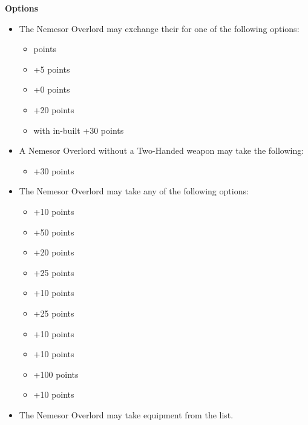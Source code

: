 \begin{minipage}[t]{0.72\textwidth}
	\vspace*{2em}
	\textbf{Options}
	\begin{itemize}
		\item The Nemesor Overlord may exchange their  for one of the following options:
		\begin{itemize}			
			\item {}  points
			\item {} \dotfill +5 points
			\item {} \dotfill +0 points
			\item {} \dotfill +20 points
			\item {} with in-built  \dotfill +30 points
		\end{itemize}
		\item A Nemesor Overlord without a Two-Handed weapon may take the following:
		\begin{itemize}
			\item {} \dotfill +30 points
		\end{itemize}
		\item The Nemesor Overlord may take any of the following options:
		\begin{itemize}
			\item {} \dotfill +10 points
			\item {} \dotfill +50 points
			\item {} \dotfill +20 points
			\item {} \dotfill +25 points
			\item {} \dotfill +10 points
			\item {} \dotfill +25 points
			\item {} \dotfill +10 points
			\item {} \dotfill +10 points
			\item {} \dotfill +100 points
			\item {} \dotfill +10 points
		\end{itemize}
		\item The Nemesor Overlord may take equipment from the  list.
	\end{itemize}
\end{minipage}


